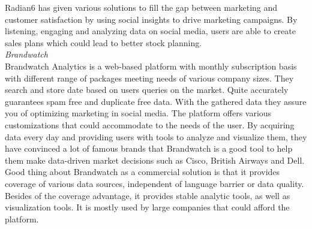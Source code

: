 Radian6 has given various solutions to fill the gap between marketing and customer satisfaction by using social insights to drive marketing campaigns. By listening, engaging and analyzing data on social media, users are able to create sales plans which could lead to better stock planning.\\
\textit{Brandwatch\\}
Brandwatch Analytics is a web-based platform with monthly subscription basis with different range of packages meeting needs of various company sizes. They search and store date based on users queries on the market. Quite accurately guarantees spam free and duplicate free data. With the gathered data they assure you of optimizing marketing in social media. The platform offers various customizations that could accommodate to the needs of the user. By acquiring data every day and providing users with tools to analyze and visualize them, they have convinced a lot of famous brands that Brandwatch is a good tool to help them make data-driven market decisions such as Cisco, British Airways and Dell. 
Good thing about Brandwatch as a commercial solution is that it provides coverage of various data sources, independent of language barrier or data quality. Besides of the coverage advantage, it provides stable analytic tools, as well as visualization tools.  It is mostly used by large companies that could afford the platform.\\
